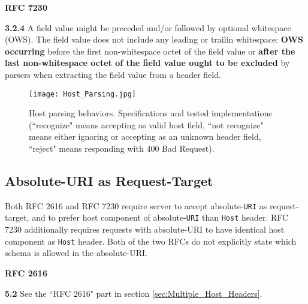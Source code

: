 \textbf{RFC 7230}
\columnseprule=1pt    %
\begin{multicols}{2}
	\begin{spacing}{0.8}
		\textbf{3.2.4} 
		{\footnotesize  A field value might be preceded and/or followed by optional
			whitespace (OWS). The field value does not include any leading or trailin whitespace: \textbf{OWS occurring} before the first non-whitespace octet of the field value or \textbf{after the last non-whitespace octet of the field value ought to be excluded} by parsers when extracting the field value from a header field.}
	\end{spacing}
\end{multicols}

\begin{figure*}[!htbp]
	\centering
	\texttt{[image: Host\_Parsing.jpg]}
	\caption{Host parsing behaviors. Specifications and tested implementations (``recognize" means accepting as valid host field, ``not recognize" means either ignoring or accepting as an unknown header field, ``reject" means responding with 400 Bad Request).}
	\label{fig:host_parsing}
\end{figure*}
\subsection{Absolute-URI as Request-Target}
Both RFC 2616 and RFC 7230 require server to accept absolute-\texttt{URI} as request-target, and to prefer host component of absolute-\texttt{URI} than \texttt{Host} header. RFC 7230 additionally requires requests with absolute-URI to have identical host component as \texttt{Host} header. Both of the two RFCs do not explicitly state which schema is allowed in the absolute-URI.

\textbf{RFC 2616}
\columnseprule=1pt    %
\begin{multicols}{2}
	\begin{spacing}{0.8}
		\textbf{5.2} 
		{\footnotesize See the ``RFC 2616" part in section \ref{sec:Multiple_Host_Headers}.}
	\end{spacing}
\end{multicols}

